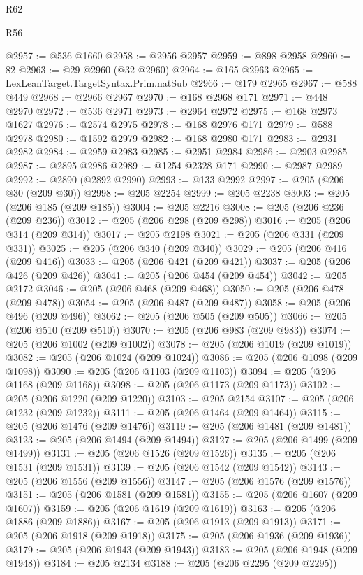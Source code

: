 \begin{lexlean}{R62}
\begin{lexlean}{R56}
\begin{coremodule}
{{{{{{{{{{{{{{{{{{{{{{{{{{{{{{{{{{{{{{{{{{{{{{{{{{{{{{{{{{{{{{{{{{{{{{{{{{{{{{{{{{{{{{{{{{{{{{{{{{{{{{{{{{{{{{{{{{{{{{{{{{{{{{{{{{{{{{{{{{{{{{{{{{{{{{{{{{{{{{{{{{{{{{{{{{{{{{{{{{{{{{{{{{{{{{{{{{{{{{{{{{{{{{{{{{{@2957 := @536 @1660
@2958 := @2956 @2957
@2959 := @898 @2958
@2960 := 82
@2963 := @29 @2960 (@32 @2960)
@2964 := @165 @2963
@2965 := LexLeanTarget.TargetSyntax.Prim.natSub
@2966 := @179 @2965
@2967 := @588 @449
@2968 := @2966 @2967
@2970 := @168 @2968 @171
@2971 := @448 @2970
@2972 := @536 @2971
@2973 := @2964 @2972
@2975 := @168 @2973 @1627
@2976 := @2574 @2975
@2978 := @168 @2976 @171
@2979 := @588 @2978
@2980 := @1592 @2979
@2982 := @168 @2980 @171
@2983 := @2931 @2982
@2984 := @2959 @2983
@2985 := @2951 @2984
@2986 := @2903 @2985
@2987 := @2895 @2986
@2989 := @1254 @2328 @171
@2990 := @2987 @2989
@2992 := @2890 (@2892 @2990)
@2993 := @133 @2992
@2997 := @205 (@206 @30 (@209 @30))
@2998 := @205 @2254
@2999 := @205 @2238
@3003 := @205 (@206 @185 (@209 @185))
@3004 := @205 @2216
@3008 := @205 (@206 @236 (@209 @236))
@3012 := @205 (@206 @298 (@209 @298))
@3016 := @205 (@206 @314 (@209 @314))
@3017 := @205 @2198
@3021 := @205 (@206 @331 (@209 @331))
@3025 := @205 (@206 @340 (@209 @340))
@3029 := @205 (@206 @416 (@209 @416))
@3033 := @205 (@206 @421 (@209 @421))
@3037 := @205 (@206 @426 (@209 @426))
@3041 := @205 (@206 @454 (@209 @454))
@3042 := @205 @2172
@3046 := @205 (@206 @468 (@209 @468))
@3050 := @205 (@206 @478 (@209 @478))
@3054 := @205 (@206 @487 (@209 @487))
@3058 := @205 (@206 @496 (@209 @496))
@3062 := @205 (@206 @505 (@209 @505))
@3066 := @205 (@206 @510 (@209 @510))
@3070 := @205 (@206 @983 (@209 @983))
@3074 := @205 (@206 @1002 (@209 @1002))
@3078 := @205 (@206 @1019 (@209 @1019))
@3082 := @205 (@206 @1024 (@209 @1024))
@3086 := @205 (@206 @1098 (@209 @1098))
@3090 := @205 (@206 @1103 (@209 @1103))
@3094 := @205 (@206 @1168 (@209 @1168))
@3098 := @205 (@206 @1173 (@209 @1173))
@3102 := @205 (@206 @1220 (@209 @1220))
@3103 := @205 @2154
@3107 := @205 (@206 @1232 (@209 @1232))
@3111 := @205 (@206 @1464 (@209 @1464))
@3115 := @205 (@206 @1476 (@209 @1476))
@3119 := @205 (@206 @1481 (@209 @1481))
@3123 := @205 (@206 @1494 (@209 @1494))
@3127 := @205 (@206 @1499 (@209 @1499))
@3131 := @205 (@206 @1526 (@209 @1526))
@3135 := @205 (@206 @1531 (@209 @1531))
@3139 := @205 (@206 @1542 (@209 @1542))
@3143 := @205 (@206 @1556 (@209 @1556))
@3147 := @205 (@206 @1576 (@209 @1576))
@3151 := @205 (@206 @1581 (@209 @1581))
@3155 := @205 (@206 @1607 (@209 @1607))
@3159 := @205 (@206 @1619 (@209 @1619))
@3163 := @205 (@206 @1886 (@209 @1886))
@3167 := @205 (@206 @1913 (@209 @1913))
@3171 := @205 (@206 @1918 (@209 @1918))
@3175 := @205 (@206 @1936 (@209 @1936))
@3179 := @205 (@206 @1943 (@209 @1943))
@3183 := @205 (@206 @1948 (@209 @1948))
@3184 := @205 @2134
@3188 := @205 (@206 @2295 (@209 @2295))
}}}}}}}}}}}}}}}}}}}}}}}}}}}}}}}}}}}}}}}}}}}}}}}}}}}}}}}}}}}}}}}}}}}}}}}}}}}}}}}}}}}}}}}}}}}}}}}}}}}}}}}}}}}}}}}}}}}}}}}}}}}}}}}}}}}}}}}}}}}}}}}}}}}}}}}}}}}}}}}}}}}}}}}}}}}}}}}}}}}}}}}}}}}}}}}}}}}}}}}}}}}}}}}}}}}
\end{coremodule}
\end{lexlean}
\end{lexlean}
